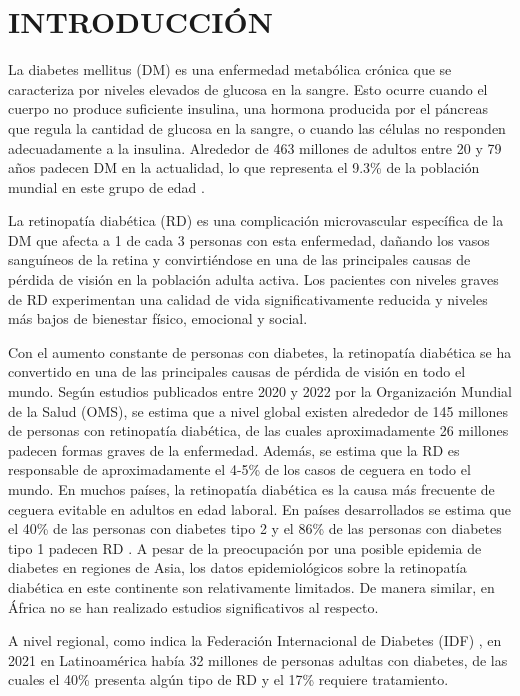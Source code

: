 
\chapter{INTRODUCCIÓN}

La diabetes mellitus (DM) es una enfermedad metabólica crónica que se caracteriza por niveles elevados de glucosa en la sangre. Esto ocurre cuando el cuerpo no produce suficiente insulina, una hormona producida por el páncreas que regula la cantidad de glucosa en la sangre, o cuando las células no responden adecuadamente a la insulina. Alrededor de 463 millones de adultos entre 20 y 79 años padecen DM en la actualidad, lo que representa el 9.3\% de la población mundial en este grupo de edad .

La retinopatía diabética (RD) es una complicación microvascular específica de la DM que afecta a 1 de cada 3 personas con esta enfermedad, dañando los vasos sanguíneos de la retina y convirtiéndose en una de las principales causas de pérdida de visión en la población adulta activa. Los pacientes con niveles graves de RD experimentan una calidad de vida significativamente reducida y niveles más bajos de bienestar físico, emocional y social.

Con el aumento constante de personas con diabetes, la retinopatía diabética se ha convertido en una de las principales causas de pérdida de visión en todo el mundo. Según estudios publicados entre 2020 y 2022 por la Organización Mundial de la Salud (OMS), se estima que a nivel global existen alrededor de 145 millones de personas con retinopatía diabética, de las cuales aproximadamente 26 millones padecen formas graves de la enfermedad. Además, se estima que la RD es responsable de aproximadamente el 4-5\% de los casos de ceguera en todo el mundo. En muchos países, la retinopatía diabética es la causa más frecuente de ceguera evitable en adultos en edad laboral. En países desarrollados se estima que el 40\% de las personas con diabetes tipo 2 y el 86\% de las personas con diabetes tipo 1 padecen RD . A pesar de la preocupación por una posible epidemia de diabetes en regiones de Asia, los datos epidemiológicos sobre la retinopatía diabética en este continente son relativamente limitados. De manera similar, en África no se han realizado estudios significativos al respecto.

A nivel regional, como indica la Federación Internacional de Diabetes (IDF) , en 2021 en Latinoamérica había 32 millones de personas adultas con diabetes, de las cuales el 40\% presenta algún tipo de RD y el 17\% requiere tratamiento.

